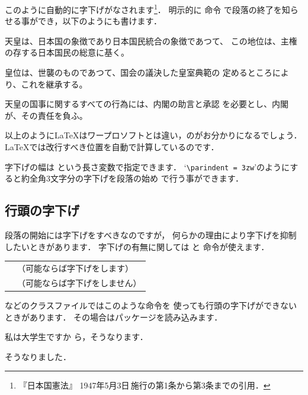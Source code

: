 このように自動的に字下げがなされます\footnote
   {『日本国憲法』 1947年5月3日\,施行の第1条から第3条までの引用．}．
明示的に 命令
で段落の終了を知らせる事ができ，以下のようにも書けます．

\begin{InText}
天皇は、日本国の象徴であり日本国民統合の象徴であつて、
この地位は、主権の存する日本国民の総意に基く。\par
皇位は、世襲のものであつて、国会の議決した皇室典範の
定めるところにより、これを継承する。\par
天皇の国事に関するすべての行為には、内閣の助言と承認
を必要とし、内閣が、その責任を負ふ。\par
\end{InText}

%
%
%
%
以上のように{\LaTeX}はワープロソフトとは違い，のがお分かりになるでしょう．
{\LaTeX}では{改行}すべき位置を自動で計算しているのです．

\begin{Trick}
%
字下げの幅は  という長さ変数で指定できます．
`\verb|\parindent = 3zw|'のようにすると約全角3文字分の字下げを段落の始め
で行う事ができます．
\end{Trick}



\subsection{行頭の字下げ}
%
%
%

段落の開始には字下げをすべきなのですが，
何らかの理由により字下げを抑制したいときがあります．
字下げの有無に関しては  と  
命令が使えます．
\begin{Syntax}
\begin{tabular}{ll}
 \C{indent}   &（可能ならば字下げをします）\\
 \C{noindent} &（可能ならば字下げをしません）
\end{tabular}
\end{Syntax}
などのクラスファイルではこのような命令を
使っても行頭の字下げができないときがあります．
その場合はパッケージを読み込みます．
\begin{InOut}
\usepackage{indentfirst}
\noindent 私は\indent 大学生ですか
ら，そうなります．\par
\noindent そうなりました．
\end{InOut}

